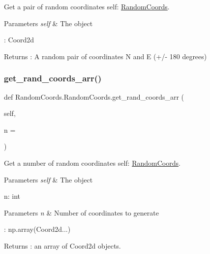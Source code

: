 Get a pair of random coordinates  self\+: \hyperlink{classRandomCoords_1_1RandomCoords}{Random\+Coords}. 


\begin{DoxyParams}{Parameters}
{\em self} & The object\\
\hline
\end{DoxyParams}
\+: Coord2d \begin{DoxyReturn}{Returns}
\+: A random pair of coordinates N and E (+/-\/ 180 degrees) 
\end{DoxyReturn}
\mbox{\label{classRandomCoords_1_1RandomCoords_adadcbdd1f667b67552fad916310404f5}} 
\subsubsection{\texorpdfstring{get\+\_\+rand\+\_\+coords\+\_\+arr()}{get\_rand\_coords\_arr()}}
{\footnotesize\ttfamily def Random\+Coords.\+Random\+Coords.\+get\+\_\+rand\+\_\+coords\+\_\+arr (\begin{DoxyParamCaption}\item[{}]{self,  }\item[{}]{n = {} }\end{DoxyParamCaption})}



Get a number of random coordinates  self\+: \hyperlink{classRandomCoords_1_1RandomCoords}{Random\+Coords}. 


\begin{DoxyParams}{Parameters}
{\em self} & The object\\
\hline
\end{DoxyParams}
n\+: int 
\begin{DoxyParams}{Parameters}
{\em n} & Number of coordinates to generate\\
\hline
\end{DoxyParams}
\+: np.\+array(Coord2d...) \begin{DoxyReturn}{Returns}
\+: an array of Coord2d objects. 
\end{DoxyReturn}
\mbox{\label{classRandomCoords_1_1RandomCoords_a1b2cc7018aaaea85d0cf14dc6e66ed21}} 
